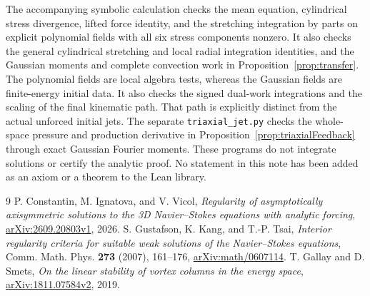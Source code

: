 \documentclass[11pt]{article}
\theoremstyle{remark}
\begin{document}
The accompanying symbolic calculation checks the mean equation,
cylindrical stress divergence, lifted force identity, and the
stretching integration by parts on explicit polynomial fields with
all six stress components nonzero. It also checks the general cylindrical
stretching and local radial integration identities, and the Gaussian
moments and complete
convection work in Proposition~\ref{prop:transfer}. The polynomial fields
are local algebra tests, whereas the Gaussian fields are finite-energy
initial data. It also checks the signed dual-work integrations and the
scaling of the final kinematic path. That path is explicitly distinct
from the actual unforced initial jets. The separate
\texttt{triaxial\_jet.py} checks the whole-space pressure and production
derivative in Proposition~\ref{prop:triaxialFeedback} through exact Gaussian
Fourier moments. These programs do not integrate solutions or certify the
analytic proof. No statement in this
note has been added as an axiom or a theorem to the Lean library.

\begin{thebibliography}{9}
P. Constantin, M. Ignatova, and V. Vicol,
\emph{Regularity of asymptotically axisymmetric solutions to the 3D
Navier--Stokes equations with analytic forcing},
\href{https://arxiv.org/abs/2609.20803}{arXiv:2609.20803v1}, 2026.
S. Gustafson, K. Kang, and T.-P. Tsai,
\emph{Interior regularity criteria for suitable weak solutions of the
Navier--Stokes equations}, Comm. Math. Phys. \textbf{273} (2007), 161--176,
\href{https://arxiv.org/abs/math/0607114}{arXiv:math/0607114}.
T. Gallay and D. Smets,
\emph{On the linear stability of vortex columns in the energy space},
\href{https://arxiv.org/abs/1811.07584}{arXiv:1811.07584v2}, 2019.
\end{thebibliography}
\end{document}
